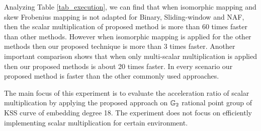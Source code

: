 \renewcommand{\baselinestretch}{1.5}
\begin{table}[!ht]
\centering
\caption{Comparison of execution time in [ms] for scalar multiplication}
\label{tab_execution}
\end{table}
\renewcommand{\baselinestretch}{1.0}

Analyzing  Table \ref{tab_execution}, we can find that when isomorphic mapping  and skew Frobenius mapping is not adapted for  Binary, Sliding-window and NAF, then the scalar multiplication of  proposed method is more than 60 times faster than other methods. However when isomorphic mapping  is applied for the other methods then our proposed technique is more than 3 times faster. Another important comparison shows that when only multi-scalar multiplication is applied then our proposed methods is about 20 times faster. 
In every scenario our proposed method is faster than the other commonly used approaches.


The main focus of this experiment is to evaluate the  acceleration ratio of scalar multiplication by applying the proposed approach on ${\mathbb{G}}_{2}$ rational point group of  KSS curve of embedding degree 18. The experiment does not focus on efficiently implementing scalar multiplication for certain environment. 

